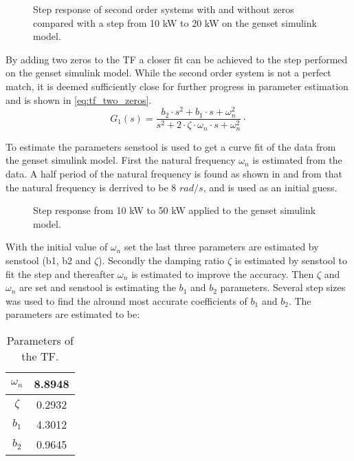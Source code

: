 \begin{figure}[H]
\centering

\caption{Step response of second order systems with and without zeros compared with a step from 10 kW to 20 kW on the genset simulink model.}
\label{fig:stepresponse_zeros}
\end{figure}

By adding two zeros to the TF a closer fit can be achieved to the step performed on the genset simulink model. While the second order system is not a perfect match, it is deemed sufficiently close for further progress in parameter estimation and is shown in \eqref{eq:tf_two_zeros}.
%
%
\begin{equation}
\label{eq:tf_two_zeros}
G_1(s) = \frac {b_2 \cdot s^2 + b_1 \cdot s+\omega_n ^2}{s^2+2\cdot \zeta \cdot \omega_n \cdot s + \omega_n ^2} \unit{\cdot}
\end{equation}    

To estimate the parameters senstool is used to get a curve fit of the data from the genset simulink model. First the natural frequency $\omega_n$ is estimated from the data. A half period of the natural frequency is found as shown in  and from that the natural frequency is derrived to be 8 $rad/s$, and is used as an initial guess. 
\begin{figure}[H]
\centering

\caption{Step response from 10 kW to 50 kW applied to the genset simulink model.}
\label{fig:stepresponse_power_10_50kW}
\end{figure}

With the initial value of $\omega_n$ set the last three parameters are estimated by senstool (b1, b2 and $\zeta$). Secondly the damping ratio $\zeta$ is estimated by senstool to fit the step and thereafter $\omega_n$ is estimated to improve the accuracy. Then $\zeta$ and $\omega_n$ are set and senstool is estimating the $b_1$ and $b_2$ parameters. Several step sizes was used to find the alround most accurate coefficients of $b_1$ and $b_2$. The parameters are estimated to be:

\begin{table}[H]
\centering
\label{tab:parameters}
\begin{tabular}{|c|c|}
\hline
$\omega_n$ & 8.8948 \\ \hline
$\zeta$  & 0.2932 \\ \hline
$b_1$       & 4.3012    \\ \hline
$b_2$       & 0.9645 \\ \hline
\end{tabular}
\caption{Parameters of the TF.}
\end{table}       

